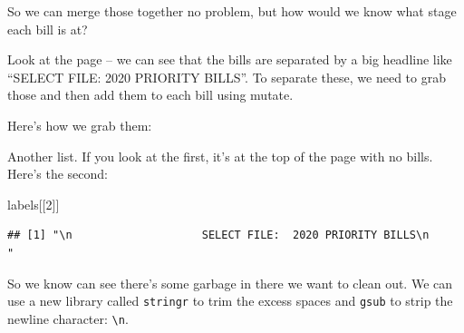 \documentclass[]{book}
\newenvironment{Shaded}{\begin{snugshade}}{\end{snugshade}}
\newcommand{\CharTok}[1]{\textcolor[rgb]{0.31,0.60,0.02}{#1}}
\newcommand{\DataTypeTok}[1]{\textcolor[rgb]{0.13,0.29,0.53}{#1}}
\newcommand{\DecValTok}[1]{\textcolor[rgb]{0.00,0.00,0.81}{#1}}
\newcommand{\KeywordTok}[1]{\textcolor[rgb]{0.13,0.29,0.53}{\textbf{#1}}}
\newcommand{\NormalTok}[1]{#1}
\newcommand{\OperatorTok}[1]{\textcolor[rgb]{0.81,0.36,0.00}{\textbf{#1}}}
\newcommand{\StringTok}[1]{\textcolor[rgb]{0.31,0.60,0.02}{#1}}
\begin{document}
So we can merge those together no problem, but how would we know what stage each bill is at?

Look at the page -- we can see that the bills are separated by a big headline like ``SELECT FILE: 2020 PRIORITY BILLS''. To separate these, we need to grab those and then add them to each bill using mutate.

Here's how we grab them:

\begin{Shaded}
\end{Shaded}

Another list. If you look at the first, it's at the top of the page with no bills. Here's the second:

\begin{Shaded}
\begin{Highlighting}[]
\NormalTok{labels[[}\DecValTok{2}\NormalTok{]]}
\end{Highlighting}
\end{Shaded}

\begin{verbatim}
## [1] "\n                    SELECT FILE:  2020 PRIORITY BILLS\n                "
\end{verbatim}

So we know can see there's some garbage in there we want to clean out. We can use a new library called \texttt{stringr} to trim the excess spaces and \texttt{gsub} to strip the newline character: \texttt{\textbackslash{}n}.

\begin{Shaded}
\end{Shaded}
\end{document}
